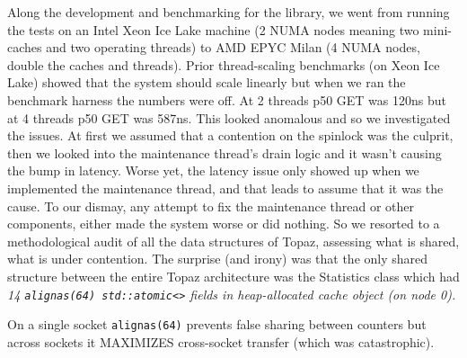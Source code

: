 \documentclass[sigplan,10pt]{acmart}
\begin{document}
%
%
%
%
%
Along the development and benchmarking for the library, 
we went from running the tests on an Intel Xeon Ice Lake machine (2 NUMA nodes meaning two mini-caches and two operating threads)
to AMD EPYC Milan (4 NUMA nodes, double the caches and threads). Prior thread-scaling benchmarks (on Xeon Ice Lake) showed that the system should scale linearly
but when we ran the benchmark harness the numbers were off. 
At 2 threads p50 GET was 120ns but at 4 threads p50 GET was 587ns. 
This looked anomalous and so we investigated the issues. At first we assumed that a contention on the spinlock was the culprit,
then we looked into the maintenance thread's drain logic and it wasn't causing the bump in latency.
Worse yet, the latency issue only showed up when we implemented the maintenance thread, and that leads to assume that it was the cause.
To our dismay, any attempt to fix the maintenance thread or other components, either made the system worse or did nothing.
So we resorted to a methodological audit of all the data structures of Topaz, assessing what is shared, what is under contention.
The surprise (and irony) was that the only shared structure between the entire Topaz architecture was the Statistics class 
which had \emph{14 \texttt{alignas(64) std::atomic<>} fields in heap-allocated cache object (on node 0).}

On a single socket \texttt{alignas(64)} prevents false sharing between counters but 
across sockets it MAXIMIZES cross-socket transfer (which was catastrophic).
\end{document}
